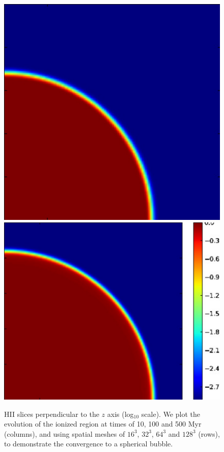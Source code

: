 \begin{figure}[t]
{  \hspace{0.1cm}
  \includegraphics[scale=0.3]{i1-HIIcontour_100myr_nx128.pdf}
  \hspace{0.1cm}
  \includegraphics[scale=0.3]{i1-HIIcontour_500myr_nx128.pdf}
  \hfill}
  \caption{HII slices perpendicular to the $z$ axis (log$_{10}$
    scale).  We plot the evolution of the ionized region at times of
    10, 100 and 500 Myr (columns), and using spatial meshes of $16^3$,
    $32^3$, $64^3$ and $128^3$ (rows), to demonstrate the convergence
    to a spherical bubble.}
  \label{fig:i1_contours}
\end{figure}


